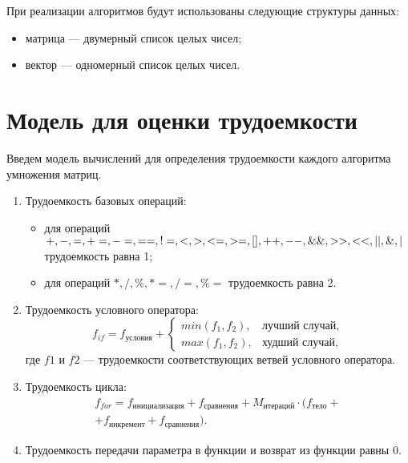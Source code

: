 При реализации алгоритмов будут использованы следующие структуры данных:

\begin{itemize}
	\item матрица --- двумерный список целых чисел;
	\item вектор --- одномерный список целых чисел.
\end{itemize}

\section{Модель для оценки трудоемкости}

Введем модель вычислений для определения трудоемкости каждого алгоритма умножения матриц.
\begin{enumerate}[label={\arabic*)}]
	\item Трудоемкость базовых операций:
	\begin{itemize}[label=---]
		\item для операций $+, -, =, +=, -=, ==, !=, <, >, <=, >=, [], ++,\\ {-}-,
			\&\&, >>, <<, ||, \&, |$
		трудоемкость равна 1;
		\item для операций $*, /, \%, *=, /=, \%=$
		трудоемкость равна 2.
	\end{itemize}
	\item Трудоемкость условного оператора:
	\begin{equation}
		\label{for:if}
		f_{if} = f_{\text{условия}} +
		\begin{cases}
			min(f_1, f_2), & \text{лучший случай},\\
			max(f_1, f_2), & \text{худший случай},
		\end{cases}
	\end{equation}
	где $f1$ и $f2$ --- трудоемкости соответствующих ветвей условного оператора.
	\item Трудоемкость цикла:
	\begin{equation}
		\label{for:for}
		\begin{gathered}
			f_{for} = f_{\text{инициализация}} + f_{\text{сравнения}} + M_{\text{итераций}} \cdot (f_{\text{тело}} +\\
			+ f_{\text{инкремент}} + f_{\text{сравнения}}).
		\end{gathered}
	\end{equation}
	\item Трудоемкость передачи параметра в функции и возврат из функции равны 0.
\end{enumerate}


